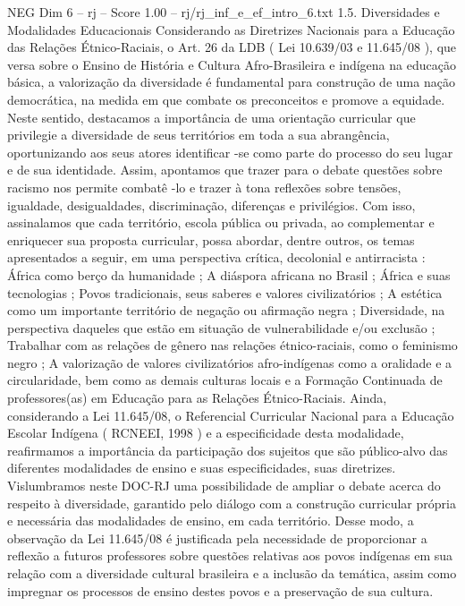 \begin{textsample}{NEG Dim 6 – rj – Score 1.00 – rj/rj\_inf\_e\_ef\_intro\_6.txt}  \label{ex:f6_neg_004}
1.5.
Diversidades e Modalidades Educacionais Considerando as Diretrizes Nacionais para a Educação das Relações Étnico-Raciais, o Art. 26 da LDB ( Lei 10.639/03 e 11.645/08 ), que versa sobre o Ensino de História e Cultura Afro-Brasileira e indígena na educação básica, a valorização da diversidade é fundamental para construção de uma nação democrática, na medida em que combate os preconceitos e promove a equidade.
Neste sentido, destacamos a importância de uma orientação curricular que privilegie a diversidade de seus territórios em toda a sua abrangência, oportunizando aos seus atores identificar -se como parte do processo do seu lugar e de sua identidade.
Assim, apontamos que trazer para o debate questões sobre racismo nos permite combatê -lo e trazer à tona reflexões sobre tensões, igualdade, desigualdades, discriminação, diferenças e privilégios.
Com isso, assinalamos que cada território, escola pública ou privada, ao complementar e enriquecer sua proposta curricular, possa abordar, dentre outros, os temas apresentados a seguir, em uma perspectiva crítica, decolonial e antirracista : África como berço da humanidade ; A diáspora africana no Brasil ; África e suas tecnologias ; Povos tradicionais, seus saberes e valores civilizatórios ; A estética como um importante território de negação ou afirmação negra ; Diversidade, na perspectiva daqueles que estão em situação de vulnerabilidade e/ou exclusão ; Trabalhar com as relações de gênero nas relações étnico-raciais, como o feminismo negro ; A valorização de valores civilizatórios afro-indígenas como a oralidade e a circularidade, bem como as demais culturas locais e a Formação Continuada de professores(as) em Educação para as Relações Étnico-Raciais.
Ainda, considerando a Lei 11.645/08, o Referencial Curricular Nacional para a Educação Escolar Indígena ( RCNEEI, 1998 ) e a especificidade desta modalidade, reafirmamos a importância da participação dos sujeitos que são público-alvo das diferentes modalidades de ensino e suas especificidades, suas diretrizes.
Vislumbramos neste DOC-RJ uma possibilidade de ampliar o debate acerca do respeito à diversidade, garantido pelo diálogo com a construção curricular própria e necessária das modalidades de ensino, em cada território.
Desse modo, a observação da Lei 11.645/08 é justificada pela necessidade de proporcionar a reflexão a futuros professores sobre questões relativas aos povos indígenas em sua relação com a diversidade cultural brasileira e a inclusão da temática, assim como impregnar os processos de ensino destes povos e a preservação de sua cultura.

\end{textsample}
